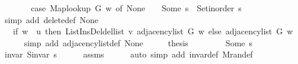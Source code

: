 \begin{isabellebody}
\ \ \isamarkupfalse%
\ \isamarkupfalse%
\ {\isachardoublequoteopen}{\isachardot}{\kern0pt}{\isachardot}{\kern0pt}{\isachardot}{\kern0pt}\ {\isacharequal}{\kern0pt}\ {\isacharparenleft}{\kern0pt}case\ Map{\isacharunderscore}{\kern0pt}lookup\ G\ w\ of\ None\ {\isasymRightarrow}\ {\isacharbrackleft}{\kern0pt}{\isacharbrackright}{\kern0pt}\ {\isacharbar}{\kern0pt}\ Some\ s\ {\isasymRightarrow}\ Set{\isacharunderscore}{\kern0pt}inorder\ s{\isacharparenright}{\kern0pt}{\isachardoublequoteclose}\isanewline
\ \ \ \ \isamarkupfalse%
\ {\isacharparenleft}{\kern0pt}simp\ add{\isacharcolon}{\kern0pt}\ delete{\isacharunderscore}{\kern0pt}def\ None{\isacharparenright}{\kern0pt}\isanewline
\ \ \isamarkupfalse%
\ \isamarkupfalse%
\ {\isachardoublequoteopen}{\isachardot}{\kern0pt}{\isachardot}{\kern0pt}{\isachardot}{\kern0pt}\ {\isacharequal}{\kern0pt}\ {\isacharparenleft}{\kern0pt}if\ w\ {\isacharequal}{\kern0pt}\ {\isacharquery}{\kern0pt}u\ then\ List{\isacharunderscore}{\kern0pt}Ins{\isacharunderscore}{\kern0pt}Del{\isachardot}{\kern0pt}del{\isacharunderscore}{\kern0pt}list\ {\isacharquery}{\kern0pt}v\ {\isacharparenleft}{\kern0pt}adjacency{\isacharunderscore}{\kern0pt}list\ G\ w{\isacharparenright}{\kern0pt}\ else\ adjacency{\isacharunderscore}{\kern0pt}list\ G\ w{\isacharparenright}{\kern0pt}{\isachardoublequoteclose}\isanewline
\ \ \ \ \isamarkupfalse%
\ {\isacharparenleft}{\kern0pt}simp\ add{\isacharcolon}{\kern0pt}\ adjacency{\isacharunderscore}{\kern0pt}list{\isacharunderscore}{\kern0pt}def\ None{\isacharparenright}{\kern0pt}\isanewline
\ \ \isamarkupfalse%
\ \isamarkupfalse%
\ {\isacharquery}{\kern0pt}thesis\isanewline
\ \ \ \ \isacommand{{\isachardot}{\kern0pt}}\isamarkupfalse%
\isanewline
{}\isamarkupfalse%
\isanewline
\ \ \isamarkupfalse%
\ {\isacharparenleft}{\kern0pt}Some\ s{\isacharparenright}{\kern0pt}\isanewline
\ \ \isamarkupfalse%
\ invar{\isacharcolon}{\kern0pt}\ {\isachardoublequoteopen}S{\isachardot}{\kern0pt}invar\ s{\isachardoublequoteclose}\isanewline
\ \ \ \ \isamarkupfalse%
\ assms{\isacharparenleft}{\kern0pt}{}{\isacharparenright}{\kern0pt}\isanewline
\ \ \ \ \isamarkupfalse%
\ {\isacharparenleft}{\kern0pt}auto\ simp\ add{\isacharcolon}{\kern0pt}\ invar{\isacharunderscore}{\kern0pt}def\ M{\isachardot}{\kern0pt}ran{\isacharunderscore}{\kern0pt}def{\isacharparenright}{\kern0pt}\isanewline
\ \ \isamarkupfalse%

\end{isabellebody}
